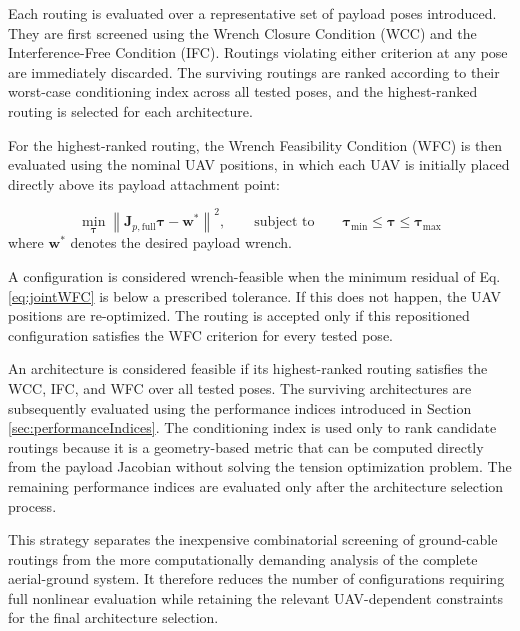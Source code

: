 Each routing is evaluated over a representative set of payload poses introduced. They are first screened using the Wrench Closure Condition (WCC) and the Interference-Free Condition (IFC). Routings violating either criterion at any pose are immediately discarded. The surviving routings are ranked according to their worst-case conditioning index across all tested poses, and the highest-ranked routing is selected for each architecture. 

For the highest-ranked routing, the Wrench Feasibility Condition (WFC) is then evaluated using the nominal UAV positions, in which each UAV is initially placed directly above its payload attachment point: 

\begin{equation}
    \min_{\boldsymbol{\tau}}
    \left\|
    \mathbf{J}_{p,\mathrm{full}}\boldsymbol{\tau}
    -\mathbf{w}^{*}
    \right\|^2,
    \qquad
    \text{subject to}
    \qquad
    \boldsymbol{\tau}_{\min}
    \leq
    \boldsymbol{\tau}
    \leq
    \boldsymbol{\tau}_{\max}
    \label{eq:jointWFC}
\end{equation}
where $\mathbf{w}^{*}$ denotes the desired payload wrench.

A configuration is considered wrench-feasible when the minimum residual of Eq. \eqref{eq:jointWFC} is below a prescribed tolerance. If this does not happen, the UAV positions are re-optimized. 
The routing is accepted only if this repositioned configuration satisfies the WFC criterion for every tested pose.

An architecture is considered feasible if its highest-ranked routing satisfies the WCC, IFC, and WFC over all tested poses. The surviving architectures are subsequently evaluated using the performance indices introduced in Section \ref{sec:performanceIndices}. The conditioning index is used only to rank candidate routings because it is a geometry-based metric that can be computed directly from the payload Jacobian without solving the tension optimization problem. The remaining performance indices are evaluated only after the architecture selection process.

This strategy separates the inexpensive combinatorial screening of ground-cable routings from the more computationally demanding analysis of the complete aerial-ground system. It therefore reduces the number of configurations requiring full nonlinear evaluation while retaining the relevant UAV-dependent constraints for the final architecture selection.


